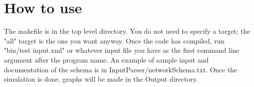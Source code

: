
\section{How to use}

The makefile is in the top level directory. You do not need to specify a target; the "all" target is the one you want anyway. Once the code has compiled, run "bin/test input.xml" or whatever input file you have as the first command line argument after the program name. An example of sample input and documentation of the schema is in InputParser/networkSchema.txt. Once the simulation is done, graphs will be made in the Output directory.